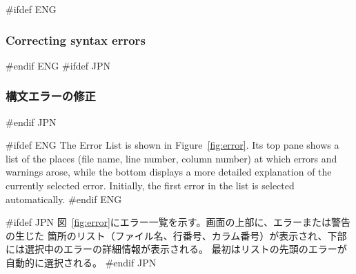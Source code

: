 \documentclass[\pformat,12pt]{article}
\newcommand{\guicmd}[1]{{\sf #1}}
\newcommand{\guicmd}[1]{{\gt #1}}
\begin{document}
#ifdef ENG
\subsubsection{Correcting syntax errors}
#endif ENG
#ifdef JPN
\subsubsection{構文エラーの修正}
#endif JPN

#ifdef ENG
The \guicmd{Error List} is shown in Figure~\ref{fig:error}. Its top
pane shows a list of the places (file name, line number, column
number) at which errors and warnings arose, while the bottom
displays a more detailed explanation of the currently selected
error. Initially, the first error in the list is selected
automatically.
#endif ENG

#ifdef JPN
図~\ref{fig:error}に\guicmd{エラー一覧}を示す。画面の上部に、エラーまたは警告の生じた
箇所のリスト（ファイル名、行番号、カラム番号）が表示され、下部には選択中のエラーの詳細情報が表示される。
最初はリストの先頭のエラーが自動的に選択される。
#endif JPN
\end{document}
